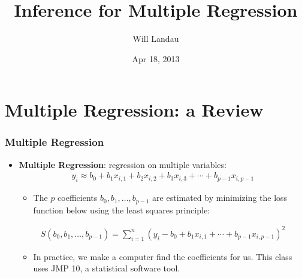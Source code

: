\documentclass[handout]{beamer}\usepackage{graphicx, color}
\title{Inference for Multiple Regression}
\author{Will Landau}
\date{Apr 18, 2013}
\institute{Iowa State University}
\numberwithin{equation}{section}
\begin{document}
\begin{frame}
\titlepage
 \end{frame}
 

\section{Multiple Regression: a Review}

\begin{frame}
\frametitle{Multiple Regression} \small
\begin{itemize}
\item {\bf Multiple Regression}: regression on multiple variables:
\pause \begin{align*}
y_i \approx b_0 + b_1 x_{i, 1} + b_2 x_{i, 2} + b_3 x_{i,3} + \cdots + b_{p-1} x_{i, p- 1}
\end{align*}
\begin{itemize}
\pause \item The $p$ coefficients $b_0, b_1, \ldots, b_{p-1}$ are estimated by minimizing the loss function below using the least squares principle:
\end{itemize}
\pause \begin{align*}
S(b_0, b_1, \ldots, b_{p-1}) = \sum_{i = 1}^n (y_i -  b_0 + b_1 x_{i, 1} + \cdots + b_{p-1} x_{i,p- 1})^2
\end{align*}
\begin{itemize}
\pause \item In practice, we make a computer find the coefficients for us. This class uses JMP 10, a statistical software tool.
\end{itemize}
\end{itemize}
\end{frame}
\end{document}
